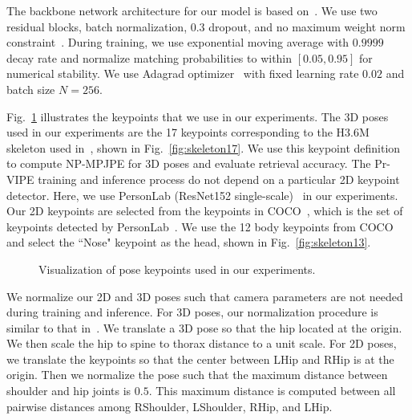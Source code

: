 The backbone network architecture for our model is based on~\cite{martinez2017simple}. We use two residual blocks, batch normalization, $0.3$ dropout, and no maximum weight norm constraint~\cite{martinez2017simple}. During training, we use exponential moving average with $0.9999$ decay rate and normalize matching probabilities to within $[0.05,0.95]$ for numerical stability. We use Adagrad optimizer~\cite{duchi2011adaptive} with fixed learning rate $0.02$ and batch size $N=256$.

 Fig.~\ref{fig:skeleton} illustrates the keypoints that we use in our experiments. The 3D poses used in our experiments are the 17 keypoints corresponding to the H3.6M~\cite{ionescu2013human3} skeleton used in~\cite{martinez2017simple}, shown in Fig.~\ref{fig:skeleton17}. We use this keypoint definition to compute NP-MPJPE for 3D poses and evaluate retrieval accuracy. The Pr-VIPE training and inference process do not depend on a particular 2D keypoint detector. Here, we use PersonLab (ResNet152 single-scale)~\cite{papandreou2018personlab} in our experiments. Our 2D keypoints are selected from the keypoints in COCO~\cite{lin2014microsoft}, which is the set of keypoints detected by PersonLab~\cite{papandreou2018personlab}. We use the 12 body keypoints from COCO and select the ``Nose" keypoint as the head, shown in Fig.~\ref{fig:skeleton13}.

\begin{figure}[t]
  \centering
  


\caption{Visualization of pose keypoints used in our experiments.}
\label{fig:skeleton}
\end{figure}

 We normalize our 2D and 3D poses such that camera parameters are not needed during training and inference. 
For 3D poses, our normalization procedure is similar to that in~\cite{chen2019unsupervised}. We translate a 3D pose so that the hip located at the origin. We then scale the hip to spine to thorax distance to a unit scale. 
For 2D poses, we translate the keypoints so that the center between LHip and RHip is at the origin. Then we normalize the pose such that the maximum distance between shoulder and hip joints is $0.5$. This maximum distance is computed between all pairwise distances among RShoulder, LShoulder, RHip, and LHip.

